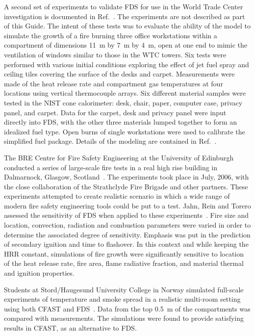A second set of experiments to validate FDS for use in the World Trade Center  investigation is  documented  in Ref.~\cite{NIST_NCSTAR_1-5E}.  The experiments
are not described as part of this Guide. The intent
of  these tests  was to  evaluate the ability  of the  model to simulate the growth  of a fire burning three  office workstations within a compartment of
dimensions 11~m by 7~m by 4~m, open at one end to mimic the ventilation  of windows similar to  those in  the WTC towers. Six tests  were performed
with various  initial conditions  exploring the effect of jet fuel spray and ceiling tiles covering the surface of the desks and carpet. Measurements
were  made of the heat release rate and compartment  gas   temperatures  at  four   locations  using  vertical thermocouple arrays. Six different
material samples were tested in the NIST  cone calorimeter:  desk,  chair, paper,  computer case,  privacy panel, and  carpet. Data for the  carpet,
desk and  privacy panel were input directly into FDS, with the other three materials lumped together to form an  idealized fuel type.  Open burns of
single  workstations were used to  calibrate the simplified fuel  package. Details of the modeling are contained in Ref.~\cite{NIST_NCSTAR_1-5F}.


The BRE Centre for Fire Safety Engineering at the University of Edinburgh conducted a series of large-scale fire tests in a real high rise building in Dalmarnock, Glasgow,
Scotland~\cite{Rein:Dalmarnock,Rein:FSJ}.
The experiments took place in July, 2006, with the close collaboration of the Strathclyde Fire Brigade and other partners.
These experiments attempted to create realistic scenario in which a wide range of modern fire safety engineering tools could be put to a test.
Jahn, Rein and Torero assessed the sensitivity of FDS when applied to these experiments~\cite{Jahn:IAFSS9}. Fire size and
location, convection, radiation and combustion parameters were varied in order to determine the associated
degree of sensitivity. Emphasis was put in the prediction of secondary ignition and time to flashover. In this
context and while keeping the HRR constant, simulations of fire growth were significantly sensitive to
location of the heat release rate, fire area, flame radiative fraction, and material thermal and ignition
properties.

Students at Stord/Haugesund University College in Norway simulated full-scale experiments of temperature and smoke spread in a
realistic multi-room setting using both CFAST and FDS~\cite{Storm:thesis}. Data from the top 0.5~m of the compartments was compared with measurements.
The simulations were found to provide satisfying results in CFAST, as an alternative to FDS.





